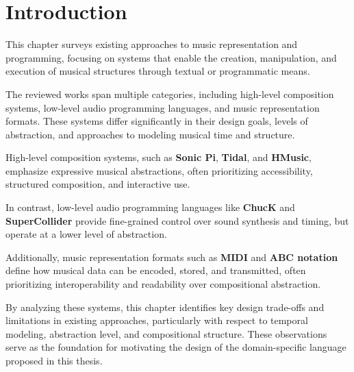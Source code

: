 \section{Introduction}\label{sec:introduction}

This chapter surveys existing approaches to music representation and programming, focusing on systems that enable the
creation, manipulation, and execution of musical structures through textual or programmatic means.

The reviewed works span multiple categories, including high-level composition systems, low-level audio programming
languages, and music representation formats.
These systems differ significantly in their design goals, levels of abstraction, and approaches to modeling musical
time and structure.

High-level composition systems, such as \textbf{Sonic Pi}, \textbf{Tidal}, and \textbf{HMusic}, emphasize expressive
musical abstractions, often prioritizing accessibility, structured composition, and interactive use.

In contrast, low-level audio programming languages like \textbf{ChucK} and \textbf{SuperCollider} provide fine-grained
control over sound synthesis and timing, but operate at a lower level of abstraction.

Additionally, music representation formats such as \textbf{MIDI} and \textbf{ABC notation} define how musical data can
be encoded, stored, and transmitted, often prioritizing interoperability and readability over compositional abstraction.

By analyzing these systems, this chapter identifies key design trade-offs and limitations in existing approaches,
particularly with respect to temporal modeling, abstraction level, and compositional structure.
These observations serve as the foundation for motivating the design of the domain-specific language proposed in
this thesis.

